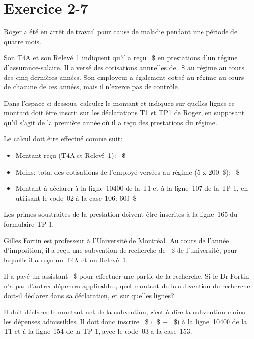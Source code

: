 \section{Exercice 2-7}
\setcounter{question}{0}
\begin{question}
	Roger a été en arrêt de travail pour cause de maladie pendant une période de quatre mois.
	
	Son T4A et son Relevé~1 indiquent qu'il a reçu ~\$ en prestations d'un régime d'assurance-salaire. Il a versé des cotisations annuelles de ~\$ au régime au cours des cinq dernières années. Son employeur a également cotisé au régime au cours de chacune de ces années, mais il n'exerce pas de contrôle. 
	
	Dans l'espace ci-dessous, calculez le montant et indiquez sur quelles lignes ce montant doit être inscrit sur les déclarations T1 et TP1 de Roger, en supposant qu'il s'agit de la première année où il a reçu des prestations du régime.
\end{question}
Le calcul doit être effectué comme suit:

\begin{itemize}
	\item Montant reçu (T4A et Relevé~1): ~\$
	\item Moins: total des cotisations de l'employé versées au régime (5 x 200~\$): ~\$ 
	\item Montant à déclarer à la ligne~10400 de la T1 et à la ligne~107 de la TP-1, en utilisant le code~02 à la case~106: 600~\$
\end{itemize}

Les primes soustraites de la prestation doivent être inscrites à la ligne~165 du formulaire TP-1.

\begin{question}
	Gilles Fortin est professeur à l'Université de Montréal. Au cours de l'année d'imposition, il a reçu une subvention de recherche de ~\$ de l'université, pour laquelle il a reçu un T4A et un
	Relevé~1.
	
	Il a payé un assistant ~\$ pour effectuer une partie de la recherche.
	Si le Dr Fortin n'a pas d'autres dépenses applicables, quel montant de la subvention de recherche doit-il déclarer dans sa déclaration, et sur quelles lignes?
\end{question}
Il doit déclarer le montant net de la subvention, c'est-à-dire la subvention moins les dépenses admissibles. Il doit donc inscrire ~\$ (~\$ $-$ ~\$) à la ligne~10400 de la T1 et à la ligne~154 de la TP-1, avec le code~03 à la case~153.



